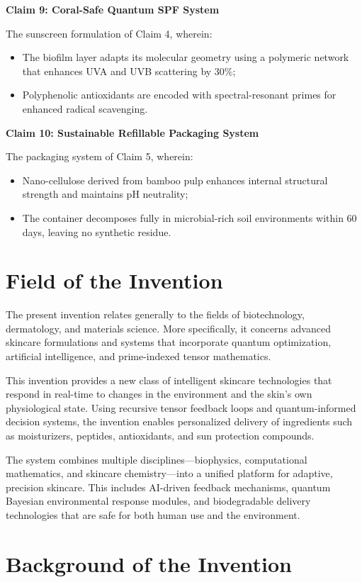 \documentclass{article}
\theoremstyle{plain}
\theoremstyle{claimstyle}
\begin{document}
\textbf{Claim 9: Coral-Safe Quantum SPF System}  

The sunscreen formulation of Claim 4, wherein:  
\begin{itemize}
    \item The biofilm layer adapts its molecular geometry using a polymeric network that enhances UVA and UVB scattering by 30\%;
    \item Polyphenolic antioxidants are encoded with spectral-resonant primes for enhanced radical scavenging.
\end{itemize}

\textbf{Claim 10: Sustainable Refillable Packaging System}  

The packaging system of Claim 5, wherein:  
\begin{itemize}
    \item Nano-cellulose derived from bamboo pulp enhances internal structural strength and maintains pH neutrality;
    \item The container decomposes fully in microbial-rich soil environments within 60 days, leaving no synthetic residue.
\end{itemize}
\section*{Field of the Invention}

The present invention relates generally to the fields of biotechnology, dermatology, and materials science. More specifically, it concerns advanced skincare formulations and systems that incorporate quantum optimization, artificial intelligence, and prime-indexed tensor mathematics.

This invention provides a new class of intelligent skincare technologies that respond in real-time to changes in the environment and the skin’s own physiological state. Using recursive tensor feedback loops and quantum-informed decision systems, the invention enables personalized delivery of ingredients such as moisturizers, peptides, antioxidants, and sun protection compounds.

The system combines multiple disciplines—biophysics, computational mathematics, and skincare chemistry—into a unified platform for adaptive, precision skincare. This includes AI-driven feedback mechanisms, quantum Bayesian environmental response modules, and biodegradable delivery technologies that are safe for both human use and the environment.
\section*{Background of the Invention}
\end{document}
